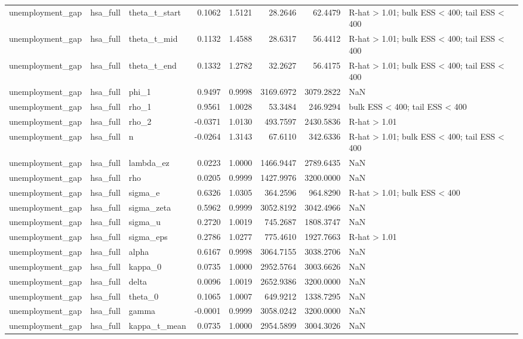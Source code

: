 \begin{tabular}{lllrrrrl}
unemployment\_gap & hsa\_full & theta\_t\_start & 0.1062 & 1.5121 & 28.2646 & 62.4479 & R-hat > 1.01; bulk ESS < 400; tail ESS < 400 \\
unemployment\_gap & hsa\_full & theta\_t\_mid & 0.1132 & 1.4588 & 28.6317 & 56.4412 & R-hat > 1.01; bulk ESS < 400; tail ESS < 400 \\
unemployment\_gap & hsa\_full & theta\_t\_end & 0.1332 & 1.2782 & 32.2627 & 56.4175 & R-hat > 1.01; bulk ESS < 400; tail ESS < 400 \\
unemployment\_gap & hsa\_full & phi\_1 & 0.9497 & 0.9998 & 3169.6972 & 3079.2822 & NaN \\
unemployment\_gap & hsa\_full & rho\_1 & 0.9561 & 1.0028 & 53.3484 & 246.9294 & bulk ESS < 400; tail ESS < 400 \\
unemployment\_gap & hsa\_full & rho\_2 & -0.0371 & 1.0130 & 493.7597 & 2430.5836 & R-hat > 1.01 \\
unemployment\_gap & hsa\_full & n & -0.0264 & 1.3143 & 67.6110 & 342.6336 & R-hat > 1.01; bulk ESS < 400; tail ESS < 400 \\
unemployment\_gap & hsa\_full & lambda\_ez & 0.0223 & 1.0000 & 1466.9447 & 2789.6435 & NaN \\
unemployment\_gap & hsa\_full & rho & 0.0205 & 0.9999 & 1427.9976 & 3200.0000 & NaN \\
unemployment\_gap & hsa\_full & sigma\_e & 0.6326 & 1.0305 & 364.2596 & 964.8290 & R-hat > 1.01; bulk ESS < 400 \\
unemployment\_gap & hsa\_full & sigma\_zeta & 0.5962 & 0.9999 & 3052.8192 & 3042.4966 & NaN \\
unemployment\_gap & hsa\_full & sigma\_u & 0.2720 & 1.0019 & 745.2687 & 1808.3747 & NaN \\
unemployment\_gap & hsa\_full & sigma\_eps & 0.2786 & 1.0277 & 775.4610 & 1927.7663 & R-hat > 1.01 \\
unemployment\_gap & hsa\_full & alpha & 0.6167 & 0.9998 & 3064.7155 & 3038.2706 & NaN \\
unemployment\_gap & hsa\_full & kappa\_0 & 0.0735 & 1.0000 & 2952.5764 & 3003.6626 & NaN \\
unemployment\_gap & hsa\_full & delta & 0.0096 & 1.0019 & 2652.9386 & 3200.0000 & NaN \\
unemployment\_gap & hsa\_full & theta\_0 & 0.1065 & 1.0007 & 649.9212 & 1338.7295 & NaN \\
unemployment\_gap & hsa\_full & gamma & -0.0001 & 0.9999 & 3058.0242 & 3200.0000 & NaN \\
unemployment\_gap & hsa\_full & kappa\_t\_mean & 0.0735 & 1.0000 & 2954.5899 & 3004.3026 & NaN \\

\end{tabular}

